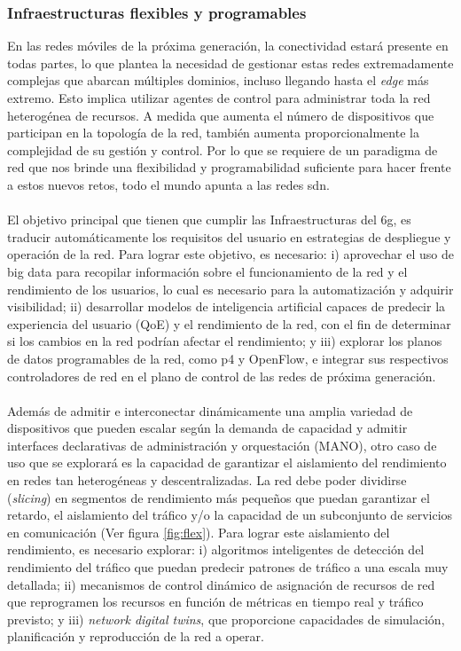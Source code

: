 \subsubsection{Infraestructuras flexibles y programables }

En las redes móviles de la próxima generación, la conectividad estará presente en todas partes, lo que plantea la necesidad de gestionar estas redes extremadamente complejas que abarcan múltiples dominios, incluso llegando hasta el \textit{edge} más extremo. Esto implica utilizar agentes de control para administrar toda la red heterogénea de recursos. A medida que aumenta el número de dispositivos que participan en la topología de la red, también aumenta proporcionalmente la complejidad de su gestión y control. Por lo que se requiere de un paradigma de red que nos brinde una flexibilidad y programabilidad suficiente para hacer frente a estos nuevos retos, todo el mundo apunta a las redes \gls{sdn}. \\
\\
El objetivo principal que tienen que cumplir las Infraestructuras del \gls{6g}, es traducir automáticamente los requisitos del usuario en estrategias de despliegue y operación de la red. Para lograr este objetivo, es necesario: i) aprovechar el uso de big data para recopilar información sobre el funcionamiento de la red y el rendimiento de los usuarios, lo cual es necesario para la automatización y adquirir visibilidad; ii) desarrollar modelos de inteligencia artificial capaces de predecir la experiencia del usuario (QoE) y el rendimiento de la red, con el fin de determinar si los cambios en la red podrían afectar el rendimiento; y iii) explorar los planos de datos programables de la red, como \gls{p4} y OpenFlow, e integrar sus respectivos controladores de red en el plano de control de las redes de próxima generación.\\
\\
Además de admitir e interconectar dinámicamente una amplia variedad de dispositivos que pueden escalar según la demanda de capacidad y admitir interfaces declarativas de administración y orquestación (MANO), otro caso de uso que se explorará es la capacidad de garantizar el aislamiento del rendimiento en redes tan heterogéneas y descentralizadas. La red debe poder dividirse (\textit{slicing})  en segmentos de rendimiento más pequeños que puedan garantizar el retardo, el aislamiento del tráfico y/o la capacidad de un subconjunto de servicios en comunicación (Ver figura \ref{fig:flex}). Para lograr este aislamiento del rendimiento, es necesario explorar: i) algoritmos inteligentes de detección del rendimiento del tráfico que puedan predecir patrones de tráfico a una escala muy detallada; ii) mecanismos de control dinámico de asignación de recursos de red que reprogramen los recursos en función de métricas en tiempo real y tráfico previsto; y iii) \textit{network digital twins}, que proporcione capacidades de simulación, planificación y reproducción de la red a operar.\\

